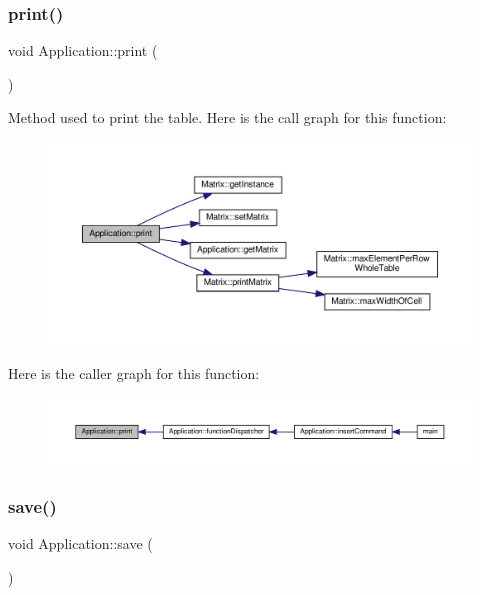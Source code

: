 \subsubsection{\texorpdfstring{print()}{print()}}
{\footnotesize\ttfamily void Application\+::print (\begin{DoxyParamCaption}{ }\end{DoxyParamCaption})\hspace{0.3cm}{\ttfamily [private]}}

Method used to print the table. Here is the call graph for this function\+:
\nopagebreak
\begin{figure}[H]
\begin{center}
\leavevmode
\includegraphics[width=350pt]{class_application_a2bc1937440cb9e71dace95c3fe7ed4ea_cgraph}
\end{center}
\end{figure}
Here is the caller graph for this function\+:
\nopagebreak
\begin{figure}[H]
\begin{center}
\leavevmode
\includegraphics[width=350pt]{class_application_a2bc1937440cb9e71dace95c3fe7ed4ea_icgraph}
\end{center}
\end{figure}
\mbox{\label{class_application_a2cbf94e01d55a814de35f90f4d874647}} 
\subsubsection{\texorpdfstring{save()}{save()}}
{\footnotesize\ttfamily void Application\+::save (\begin{DoxyParamCaption}{ }\end{DoxyParamCaption})\hspace{0.3cm}{\ttfamily [private]}}

